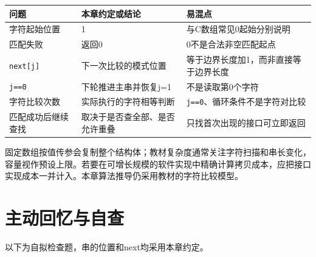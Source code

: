 \begin{wideblock}

\par\medskip\noindent\begin{minipage}{\linewidth}\fontsize{9.3}{12}\selectfont\begin{tabularx}{\linewidth}{@{}YYY@{}}
\toprule\noalign{}
\begin{minipage}[b]{\linewidth}\raggedright
问题
\end{minipage} & \begin{minipage}[b]{\linewidth}\raggedright
本章约定或结论
\end{minipage} & \begin{minipage}[b]{\linewidth}\raggedright
易混点
\end{minipage} \\
\midrule\noalign{}


字符起始位置 & 1 & 与C数组常见0起始分别说明 \\
匹配失败 & 返回0 & 0不是合法非空匹配起点 \\
\texttt{next[\allowbreak{}j]\allowbreak{}} & 下一次比较的模式位置 & 等于边界长度加1，而非直接等于边界长度 \\
\texttt{j=\allowbreak{}=\allowbreak{}0} & 下轮推进主串并恢复j=1 & 不是读取第0个字符 \\
字符比较次数 & 实际执行的字符相等判断 & \texttt{j=\allowbreak{}=\allowbreak{}0}、循环条件不是字符对比较 \\
匹配成功后继续查找 & 取决于是否查全部、是否允许重叠 & 只找首次出现的接口可立即返回 \\
\bottomrule\end{tabularx}
\end{minipage}\par\medskip

\end{wideblock}

固定数组按值传参会复制整个结构体；教材复杂度通常关注字符扫描和串长变化，容量视作预设上限。若要在可增长规模的软件实现中精确计算拷贝成本，应把接口实现成本一并计入。本章算法推导仍采用教材的字符比较模型。

\section{主动回忆与自查}\label{DS04-check}

以下为自拟检查题，串的位置和next均采用本章约定。

